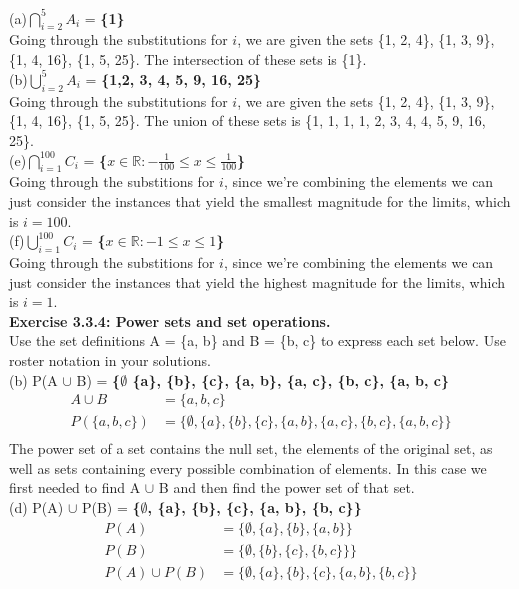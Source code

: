\documentclass[12pt, letterpaper, twoside]{article}
\begin{document}
(a)$\bigcap\limits_{i=2}^{5}A_{i}$ = \textbf{\{1\}}\\
Going through the substitutions for $i$, we are given the sets \{1, 2, 4\}, \{1, 3, 9\}, \{1, 4, 16\}, \{1, 5, 25\}. The intersection of these sets is \{1\}.\\
\break
(b)$\bigcup\limits_{i=2}^{5}A_{i}$ = \textbf{\{1,2, 3, 4, 5, 9, 16, 25\}}\\
Going through the substitutions for $i$, we are given the sets \{1, 2, 4\}, \{1, 3, 9\}, \{1, 4, 16\}, \{1, 5, 25\}. The union of these sets is \{1, 1, 1, 1, 2, 3, 4, 4, 5, 9, 16, 25\}.\\
\break
(e)$\bigcap\limits_{i=1}^{100}C_{i}$ = \textbf{\{$x \in \mathbb{R}: -\frac{1}{100} \leq x \leq \frac{1}{100}$\}}\\
Going through the substitions for $i$, since we're combining the elements we can just consider the instances that yield the smallest magnitude for the limits, which is $i=100$.\\
\break
(f)$\bigcup\limits_{i=1}^{100}C_{i}$ = \textbf{\{$x \in \mathbb{R}: -1 \leq x \leq 1$\}}\\
Going through the substitions for $i$, since we're combining the elements we can just consider the instances that yield the highest magnitude for the limits, which is $i=1$.\\
\break
\newpage
\noindent\textbf{Exercise 3.3.4: Power sets and set operations.}\\
Use the set definitions A = \{a, b\} and B = \{b, c\} to express each set below. Use roster notation in your solutions.\\
\break
(b) P(A $\cup$ B) = \textbf{\{$\emptyset$ \{a\}, \{b\}, \{c\}, \{a, b\}, \{a, c\}, \{b, c\}, \{a, b, c\}}\\
\begin{align*}
A \cup B &= \{a, b, c\}\\
P(\{a, b, c\}) &= \{\emptyset, \{a\}, \{b\}, \{c\}, \{a, b\}, \{a, c\}, \{b, c\}, \{a, b, c\}\}\\
\end{align*}
The power set of a set contains the null set, the elements of the original set, as well as sets containing every possible combination of elements. In this case we first needed to find A $\cup$ B and then find the power set of that set.\\
\break
(d) P(A) $\cup$ P(B) = \textbf{\{$\emptyset$, \{a\}, \{b\}, \{c\}, \{a, b\}, \{b, c\}\}}\\
\begin{align*}
P(A) &= \{\emptyset, \{a\}, \{b\}, \{a, b\}\}\\
P(B) &= \{\emptyset, \{b\}, \{c\}, \{b, c\}\}\}\\
P(A) \cup P(B) &= \{\emptyset, \{a\}, \{b\}, \{c\}, \{a, b\}, \{b, c\}\}\\
\end{align*}
\end{document}
